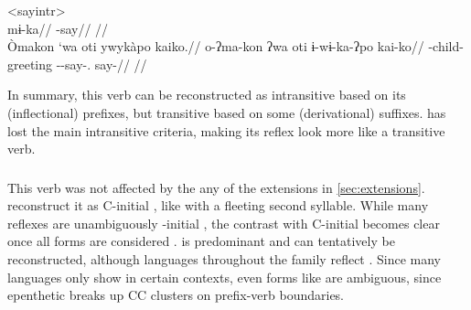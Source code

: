 \pex<sayintr>
 \akuriyo \parencite[][113]{meira1998proto}\\
\begingl
\gla mɨ-ka//
\glb {}-say//
\glft {}//
\endgl
{} \kalina \parencite[][202]{courtz2008carib}\\
\begingl
\glpreamble Òmakon `wa oti ywykàpo kaiko.//
\gla o-ʔma-kon ʔwa oti ɨ-wɨ-ka-ʔpo kai-ko//
\glb {}-child-  greeting --say-. say-//
\glft {}//
\endgl
\xe

In summary, this verb can be reconstructed as intransitive based on its (inflectional) prefixes, but transitive based on some (derivational) suffixes.
\hixka has lost the main intransitive criteria, making its reflex look more like a transitive verb.

\subsubsection{ }
\label{sec:go}
This verb was not affected by the any of the extensions in \cref{sec:extensions}.
\textcite{gildea2007greenberg} reconstruct it as C-initial , like   with a fleeting second syllable.
While many reflexes are unambiguously -initial , the contrast with C-initial  becomes clear once all forms are considered .
 is predominant and can tentatively be reconstructed, although languages throughout the family reflect .
Since many languages only show  in certain contexts, even forms like \trio {}  \parencite[43]{triomeira1999} are ambiguous, since epenthetic  breaks up CC clusters on prefix-verb boundaries.




